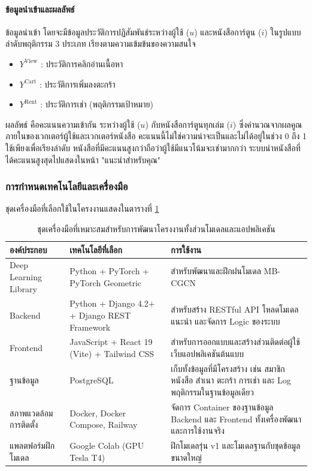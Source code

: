 \paragraph{ข้อมูลนำเข้าและผลลัพธ์}
ข้อมูลนำเข้า โดยจะมีข้อมูลประวัติการปฏิสัมพันธ์ระหว่างผู้ใช้ ($u$) และหนังสือการ์ตูน ($i$) ในรูปแบบลำดับพฤติกรรม 3 ประเภท เรียงตามความเข้มข้นของความสนใจ
\begin{itemize}
    \item $Y^{\text{View}}$ : ประวัติการคลิกอ่านเนื้อหา
    \item $Y^{\text{Cart}}$ : ประวัติการเพิ่มลงตะกร้า
    \item $Y^{\text{Rent}}$ : ประวัติการเช่า (พฤติกรรมเป้าหมาย)
\end{itemize}
ผลลัพธ์ คือคะแนนความเข้ากัน ระหว่างผู้ใช้ ($u$) กับหนังสือการ์ตูนทุกเล่ม ($i$) ซึ่งคำนวณจากผลคูณภายในของเวกเตอร์ผู้ใช้และเวกเตอร์หนังสือ คะแนนนี้ไม่ใช่ความน่าจะเป็นและไม่ได้อยู่ในช่วง 0 ถึง 1 ใช้เพียงเพื่อเรียงลำดับ หนังสือที่มีคะแนนสูงกว่าถือว่าผู้ใช้มีแนวโน้มจะเช่ามากกว่า ระบบนำหนังสือที่ได้คะแนนสูงสุดไปแสดงในหน้า "แนะนำสำหรับคุณ" 

\subsubsection{การกำหนดเทคโนโลยีและเครื่องมือ}  ชุดเครื่องมือที่เลือกใช้ในโครงงานแสดงในตารางที่ \ref{tab:tools}

\begin{table}[H]
\centering
\caption{ชุดเครื่องมือที่เหมาะสมสำหรับการพัฒนาโครงงานทั้งส่วนโมเดลและแอปพลิเคชัน}
\label{tab:tools}
\begin{tabularx}{\textwidth}{|p{3.2cm}|p{4.2cm}|X|}
\hline
\textbf{องค์ประกอบ} & \textbf{เทคโนโลยีที่เลือก} & \textbf{การใช้งาน} \\
\hline
Deep Learning Library & Python + PyTorch + PyTorch Geometric & สำหรับพัฒนาและฝึกฝนโมเดล MB-CGCN \\ \hline
Backend & Python + Django 4.2+ + Django REST Framework & สำหรับสร้าง RESTful API โหลดโมเดลแนะนำ และจัดการ Logic ของระบบ \\ \hline
Frontend & JavaScript + React 19 (Vite) + Tailwind CSS & สำหรับการออกแบบและสร้างส่วนติดต่อผู้ใช้เว็บแอปพลิเคชันต้นแบบ \\ \hline
ฐานข้อมูล & PostgreSQL & เก็บทั้งข้อมูลที่มีโครงสร้าง เช่น สมาชิก หนังสือ สำเนา ตะกร้า การเช่า และ Log พฤติกรรมในฐานข้อมูลเดียว \\ \hline
สภาพแวดล้อมการติดตั้ง & Docker, Docker Compose, Railway & จัดการ Container ของฐานข้อมูล Backend และ Frontend ทั้งเครื่องพัฒนาและการใช้งานจริง \\ \hline
แพลตฟอร์มฝึกโมเดล & Google Colab (GPU Tesla T4) & ฝึกโมเดลรุ่น v1 และโมเดลฐานกับชุดข้อมูลขนาดใหญ่ \\ \hline
\end{tabularx}
\end{table}


